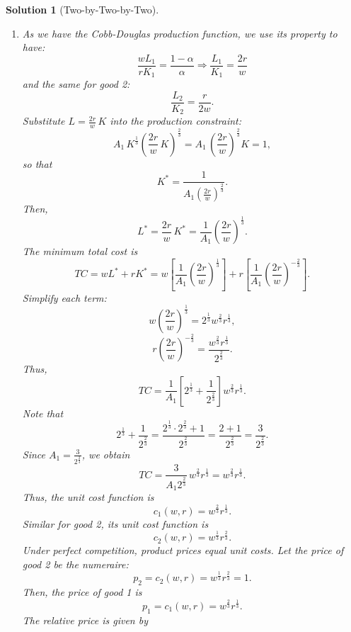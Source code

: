 \documentclass[a4paper,12pt]{article} %
\theoremstyle{nonitalic}
\newtheorem{solution}{Solution}
\begin{document}
\begin{solution}[Two-by-Two-by-Two]
\begin{enumerate}
        \item[6.] As we have the Cobb-Douglas production function, we use its property to have:
            \[\frac{w L_1}{r K_1} = \frac{1-\alpha}{\alpha} \Rightarrow \frac{L_1}{K_1} = \frac{2r}{w}\]
            and the same for good 2:
            \[\frac{L_2}{K_2} = \frac{r}{2w}. \]
            Substitute $L = \frac{2r}{w}\,K$ into the production constraint:
            \[
            A_1\,K^{\frac{1}{3}}\left(\frac{2r}{w}\,K\right)^{\frac{2}{3}} = A_1\,\left(\frac{2r}{w}\right)^{\frac{2}{3}}K = 1,
            \]
            so that
            \[
            K^* = \frac{1}{A_1 \left(\frac{2r}{w}\right)^{\frac{2}{3}}}.
            \]
            Then,
            \[
            L^* = \frac{2r}{w}\,K^* = \frac{1}{A_1}\left(\frac{2r}{w}\right)^{\frac{1}{3}}.
            \]
            The minimum total cost is
            \[
            TC = wL^* + rK^* = w\left[\frac{1}{A_1}\left(\frac{2r}{w}\right)^{\frac{1}{3}}\right] + r\left[\frac{1}{A_1}\left(\frac{2r}{w}\right)^{-\frac{2}{3}}\right].
            \]
            Simplify each term:
            \[
            w\left(\frac{2r}{w}\right)^{\frac{1}{3}} = 2^{\frac{1}{3}}w^{\frac{2}{3}}r^{\frac{1}{3}},
            \]
            \[
            r\left(\frac{2r}{w}\right)^{-\frac{2}{3}} = \frac{w^{\frac{2}{3}}r^{\frac{1}{3}}}{2^{\frac{2}{3}}}.
            \]
            Thus,
            \[
            TC = \frac{1}{A_1}\left[2^{\frac{1}{3}} + \frac{1}{2^{\frac{2}{3}}}\right] w^{\frac{2}{3}}r^{\frac{1}{3}}.
            \]
            Note that
            \[
            2^{\frac{1}{3}} + \frac{1}{2^{\frac{2}{3}}} = \frac{2^{\frac{1}{3}} \cdot 2^{\frac{2}{3}} + 1}{2^{\frac{2}{3}}} = \frac{2 + 1}{2^{\frac{2}{3}}} = \frac{3}{2^{\frac{2}{3}}}.
            \]
            Since $A_1=\frac{3}{2^{\frac{2}{3}}}$, we obtain
            \[
            TC = \frac{3}{A_1 2^{\frac{2}{3}}}\,w^{\frac{2}{3}}r^{\frac{1}{3}} = w^{\frac{2}{3}}r^{\frac{1}{3}}.
            \]
            Thus, the unit cost function is
            \[
            c_1(w,r)=w^{\frac{2}{3}}r^{\frac{1}{3}}.
            \]
            Similar for good 2, its unit cost function is
            \[
            c_2(w,r)=w^{\frac{1}{3}}r^{\frac{2}{3}}.
            \]
            Under perfect competition, product prices equal unit costs. Let the price of good 2 be the numeraire:
            \[
            p_2 = c_2(w,r) = w^{\frac{1}{3}}r^{\frac{2}{3}} = 1.
            \]
            Then, the price of good 1 is
            \[
            p_1 = c_1(w,r) = w^{\frac{2}{3}}r^{\frac{1}{3}}.
            \]
            The relative price is given by

\end{enumerate}
\end{solution}
\end{document}
